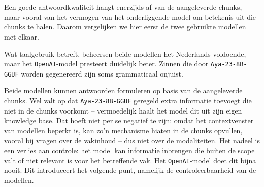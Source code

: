 \chapter{}%
\label{ch:conclusie}


\section{}%
\label{sec:bespreking-resultaten}

\subsection{}%
\label{sec:vergelijking-modellen}

Een goede antwoordkwaliteit hangt enerzijds af van de aangeleverde chunks, maar vooral van het vermogen van het onderliggende model om betekenis uit die chunks te halen. Daarom vergelijken we hier eerst de twee gebruikte modellen met elkaar.

Wat taalgebruik betreft, beheersen beide modellen het Nederlands voldoende, maar het \texttt{OpenAI}-model presteert duidelijk beter. Zinnen die door \texttt{Aya-23-8B-GGUF} worden gegenereerd zijn soms grammaticaal onjuist.

Beide modellen kunnen antwoorden formuleren op basis van de aangeleverde chunks. Wel valt op dat \texttt{Aya-23-8B-GGUF} geregeld extra informatie toevoegt die niet in de chunks voorkomt -- vermoedelijk haalt het model dit uit zijn eigen knowledge base. Dat hoeft niet per se negatief te zijn: omdat het contextvenster van modellen beperkt is, kan zo’n mechanisme hiaten in de chunks opvullen, vooral bij vragen over de vakinhoud -- dus niet over de modaliteiten. Het nadeel is een verlies aan controle: het model kan informatie inbrengen die buiten de scope valt of niet relevant is voor het betreffende vak. Het \texttt{OpenAI}-model doet dit bijna nooit. Dit introduceert het volgende punt, namelijk de controleerbaarheid van de modellen.

